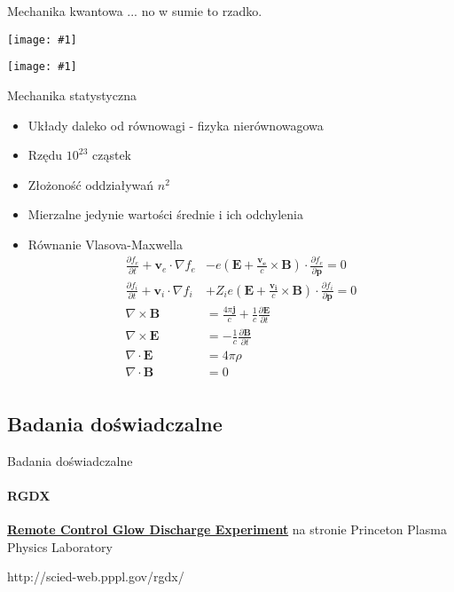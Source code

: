 \documentclass{beamer}
\newcommand {\framedgraphic}[1] {
        \begin{center}
            \texttt{[image: \#1]}
        \end{center}
}
\begin{document}
\begin{frame}[t]{Mechanika kwantowa}
  ... no w sumie to rzadko.
  \framedgraphic{img/google_plasma.png}
  \pause
  \framedgraphic{img/google_qplasma.png}
\end{frame}

\begin{frame}[t]{Mechanika statystyczna}
  \begin{itemize}[<+->]
    \item Układy daleko od równowagi - fizyka nierównowagowa
    \item Rzędu $10^{23}$ cząstek
    \item Złożoność oddziaływań $n^2$
    \item Mierzalne jedynie wartości średnie i ich odchylenia
    \item Równanie Vlasova-Maxwella
    \begin{align}
      \frac{\partial f_e}{\partial t} + \mathbf {v}_e\cdot\nabla f_e &- e\left(\mathbf {E}+\frac{\mathbf {v_e}}{c}\times\mathbf {B}\right)\cdot\frac{\partial f_e}{\partial\mathbf {p}} = 0 \\
      \frac{\partial f_i}{\partial t} + \mathbf {v}_i\cdot\nabla f_i &+ Z_i e\left(\mathbf {E}+\frac{\mathbf {v_i}}{c}\times\mathbf {B}\right)\cdot\frac{\partial f_i}{\partial\mathbf {p}} = 0 \\
      \nabla\times\mathbf {B} &=\frac{4\pi\mathbf {j}}{c}+\frac{1}{c}\frac{\partial\mathbf {E}}{\partial t} \\
      \nabla\times\mathbf {E} &=-\frac{1}{c}\frac{\partial\mathbf {B}}{\partial t} \\
      \nabla\cdot\mathbf {E}  &=4\pi\rho \\
      \nabla\cdot\mathbf {B}  &=0 \\
    \end{align}
  \end{itemize}
\end{frame}

\subsection{Badania doświadczalne}
\begin{frame}[t]{Badania doświadczalne}
  \framesubtitle{RGDX}
  \href{http://scied-web.pppl.gov/rgdx/}{\textbf{Remote Control Glow Discharge Experiment}}
  na stronie Princeton Plasma Physics Laboratory

  http://scied-web.pppl.gov/rgdx/
\end{frame}
\end{document}
